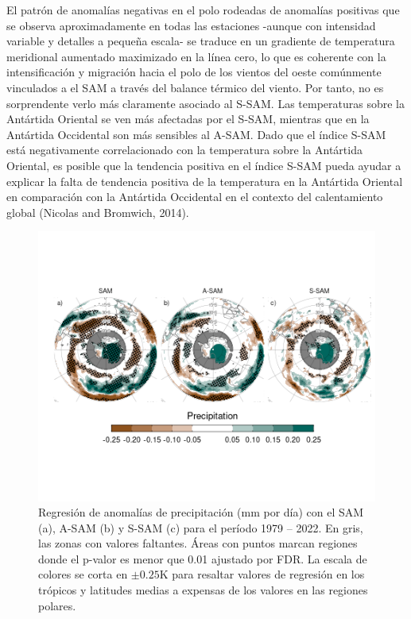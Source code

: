 \documentclass[12pt,oneside]{reedthesis}
\begin{document}
El patrón de anomalías negativas en el polo rodeadas de anomalías positivas que se observa aproximadamente en todas las estaciones -aunque con intensidad variable y detalles a pequeña escala- se traduce en un gradiente de temperatura meridional aumentado maximizado en la línea cero, lo que es coherente con la intensificación y migración hacia el polo de los vientos del oeste comúnmente vinculados a el SAM a través del balance térmico del viento.
Por tanto, no es sorprendente verlo más claramente asociado al S-SAM.
Las temperaturas sobre la Antártida Oriental se ven más afectadas por el S-SAM, mientras que en la Antártida Occidental son más sensibles al A-SAM.
Dado que el índice S-SAM está negativamente correlacionado con la temperatura sobre la Antártida Oriental, es posible que la tendencia positiva en el índice S-SAM pueda ayudar a explicar la falta de tendencia positiva de la temperatura en la Antártida Oriental en comparación con la Antártida Occidental en el contexto del calentamiento global (Nicolas and Bromwich, 2014).






\begin{figure}
\includegraphics{figures/30-sam/global-pp-1} \caption{Regresión de anomalías de precipitación (mm por día) con el SAM (a), A-SAM (b) y S-SAM (c) para el período 1979 -- 2022.
En gris, las zonas con valores faltantes.
Áreas con puntos marcan regiones donde el p-valor es menor que 0.01 ajustado por FDR.
La escala de colores se corta en \(\pm0.25 \mathrm{K}\) para resaltar valores de regresión en los trópicos y latitudes medias a expensas de los valores en las regiones polares.}\label{fig:global-pp}
\end{figure}
\end{document}

